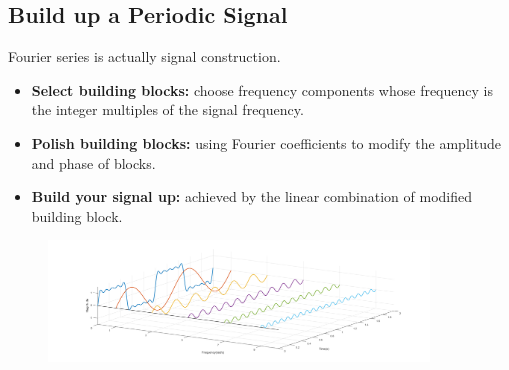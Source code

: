 \documentclass[margin,line]{res}
\begin{document}
\begin{resume}
\subsection{\textbf{Build up a Periodic Signal}}
Fourier series is actually signal construction.
\begin{itemize}
	\item \textbf{Select building blocks:} choose frequency components whose frequency is the integer multiples of the signal frequency.
	\item \textbf{Polish building blocks:} using Fourier coefficients to modify the amplitude and phase of blocks.
	\item \textbf{Build your signal up:} achieved by the linear combination of modified building block.
\end{itemize}
\begin{figure}[H]
	\begin{minipage}{0.5\linewidth}
		\centerline{}
	\end{minipage}
	\begin{minipage}{0.5\linewidth}
		\centerline{\includegraphics[width=0.9\textwidth]{figure/fig_9.png}}
	\end{minipage}
\end{figure}

\end{resume}
\end{document}
